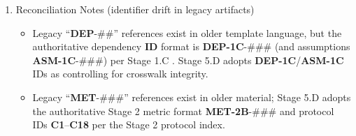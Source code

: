 \documentclass[10pt]{article}
\begin{document}
\begin{enumerate}
F) Hydration feasibility

\begin{itemize}
\item \textbf{DEP-1C-018} Hydration access and container availability
\end{itemize}

G) Facility access treated as optional; substitutes must exist

\begin{itemize}
\item \textbf{DEP-1C-003} Facility access posture explicitly optional with substitutes defined
\item \textbf{DEP-1C-004} Facility access posture explicitly optional with substitutes defined
\end{itemize}

H) Underwater governance is conditional and hard-gated

\begin{itemize}
\item \textbf{DEP-1C-011} Water safety governance availability for any underwater/breath-hold exposure
\item Underwater metrics exist in Stage 2 under protocol \textbf{C14} (\textbf{MET-2B-025} and \textbf{MET-2B-026}) and are gate-critical only when governance is satisfied .
\end{itemize}

\item Reconciliation Notes (identifier drift in legacy artifacts)

\begin{itemize}
\item Legacy “\textbf{DEP}-##” references exist in older template language, but the authoritative dependency \textbf{ID} format is \textbf{DEP-1C}-### (and assumptions \textbf{ASM-1C}-###) per Stage 1.C . Stage 5.D adopts \textbf{DEP-1C}/\textbf{ASM-1C} IDs as controlling for crosswalk integrity.
\item Legacy “\textbf{MET}-###” references exist in older material; Stage 5.D adopts the authoritative Stage 2 metric format \textbf{MET-2B}-### and protocol IDs \textbf{C1}–\textbf{C18} per the Stage 2 protocol index.
\end{itemize}

\end{enumerate}
\end{document}

